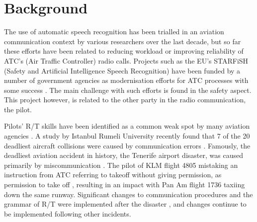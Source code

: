 \chapter{Background}
\label{ch:background}

The use of automatic speech recognition has been trialled in an aviation communication context by various researchers over the last decade, but so far these efforts have been related to reducing workload or improving reliability of ATC's (Air Traffic Controller) radio calls. Projects such as the EU's STARFiSH (Safety and Artificial Intelligence Speech Recognition) have been funded by a number of government agencies as modernisation efforts for ATC processes with some success \cite{STARFiSH}. The main challenge with such efforts is found in the safety aspect. This project however, is related to the other party in the radio communication, the pilot.


Pilots' R/T skills have been identified as a common weak spot by many aviation agencies \cite{flight-safety-failure-to-communicate}. A study by Istanbul Rumeli University recently found that 7 of the 20 deadliest aircraft collisions were caused by communication errors \cite{communication-in-accidents}. Famously, the deadliest aviation accident in history, the Tenerife airport disaster, was caused primarily by miscommunication \cite{tenerife-accident-description}. The pilot of KLM flight 4805 mistaking an instruction from ATC referring to takeoff without giving permission, as permission to take off \cite{tenerife-accident-description}, resulting in an impact with Pan Am flight 1736 taxiing down the same runway. Significant changes to communication procedures and the grammar of R/T were implemented after the disaster \cite{CAP413-ed15-ch2-p6}, and changes continue to be implemented following other incidents.

